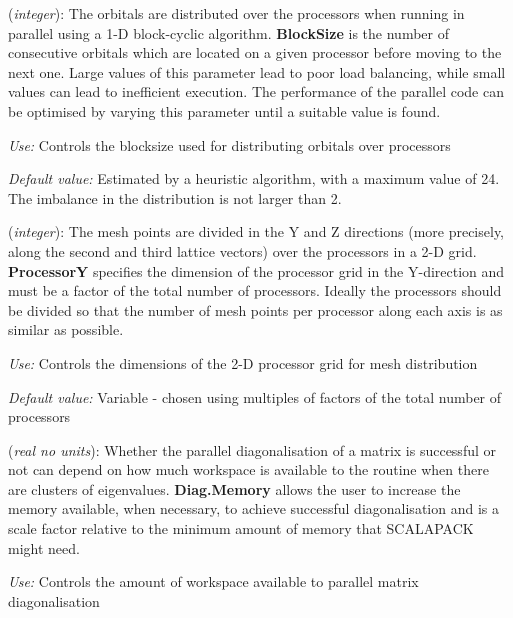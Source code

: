 \begin{description}
\itemsep 10pt
\parsep 0pt

\item[\textbf{BlockSize}] (\textit{integer}):  The orbitals are distributed over the processors when
running in parallel using a 1-D block-cyclic algorithm. \textbf{BlockSize} is the number of consecutive orbitals which are located on
a given processor before moving to the next one. Large values of this
parameter lead to poor load balancing, while small values can lead to
inefficient execution.  The performance of the parallel code can be
optimised by varying this parameter until a suitable value is found.

\textit{Use:} Controls the blocksize used for distributing orbitals over
processors

\textit{Default value:}  Estimated by a heuristic algorithm, with a
maximum value of 24. The imbalance in the distribution is not
larger than 2.

\item[\textbf{ProcessorY}] (\textit{integer}):  The mesh points are divided in the Y and Z directions
(more precisely, along the second and third lattice vectors)
over the processors in a 2-D grid. \textbf{ProcessorY} specifies the
dimension of the processor grid in the Y-direction and must be a
factor of the total number of processors. Ideally the processors
should be divided so that the number of mesh points per processor
along each axis is as similar as possible.

\textit{Use:} Controls the dimensions of the 2-D processor grid for mesh
distribution

\textit{Default value:} Variable - chosen using multiples of factors of
  the total number of processors

\item[\textbf{Diag.Memory}] (\textit{real no units}):
Whether the parallel diagonalisation of a matrix is successful or not can
depend on how much workspace is available to the routine when there are
clusters of eigenvalues. \textbf{Diag.Memory} allows the user to increase
the memory available, when necessary, to achieve successful diagonalisation
and is a scale factor relative to the minimum amount of memory that
SCALAPACK might need.

\textit{Use:} Controls the amount of workspace available to parallel
matrix diagonalisation


\end{description}
